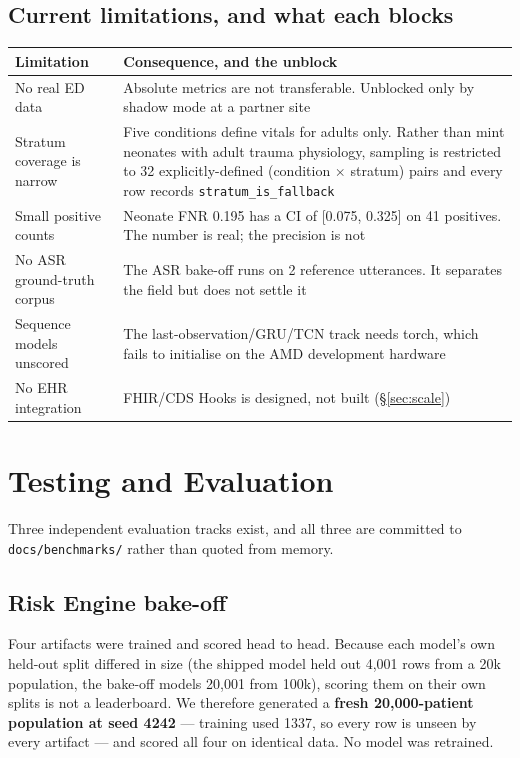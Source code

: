 \documentclass[10pt,a4paper,twocolumn]{article}
\newcommand{\pth}[1]{\textcolor{SecPurple}{\texttt{#1}}}
\newcommand{\cm}[1]{\texttt{#1}}
\begin{document}
\subsection{Current limitations, and what each blocks}
\begin{center}\footnotesize\sffamily
\begin{tabular}{@{}p{2.35cm}p{5.45cm}@{}}
\toprule
\rowcolor{AccPurple!10}
\textbf{Limitation} & \textbf{Consequence, and the unblock}\\
\midrule
No real ED data & Absolute metrics are not transferable. Unblocked only by shadow mode at a partner site\\
\addlinespace[2pt]
Stratum coverage is narrow & Five conditions define vitals for adults only. Rather than mint neonates with adult trauma physiology, sampling is restricted to 32 explicitly-defined (condition $\times$ stratum) pairs and every row records \cm{stratum\_is\_fallback}\\
\addlinespace[2pt]
Small positive counts & Neonate FNR 0.195 has a CI of [0.075, 0.325] on 41 positives. The number is real; the precision is not\\
\addlinespace[2pt]
No ASR ground-truth corpus & The ASR bake-off runs on 2 reference utterances. It separates the field but does not settle it\\
\addlinespace[2pt]
Sequence models unscored & The last-observation/GRU/TCN track needs torch, which fails to initialise on the AMD development hardware\\
\addlinespace[2pt]
No EHR integration & FHIR/CDS Hooks is designed, not built (\S\ref{sec:scale})\\
\bottomrule
\end{tabular}
\end{center}

\section{Testing and Evaluation}
\label{sec:eval}

Three independent evaluation tracks exist, and all three are committed to
\pth{docs/benchmarks/} rather than quoted from memory.

\subsection{Risk Engine bake-off}
Four artifacts were trained and scored head to head. Because each model's own held-out split
differed in size (the shipped model held out 4{,}001 rows from a 20k population, the bake-off
models 20{,}001 from 100k), scoring them on their own splits is not a leaderboard. We therefore
generated a \textbf{fresh 20{,}000-patient population at seed 4242} --- training used 1337, so every
row is unseen by every artifact --- and scored all four on identical data. No model was retrained.
\end{document}

